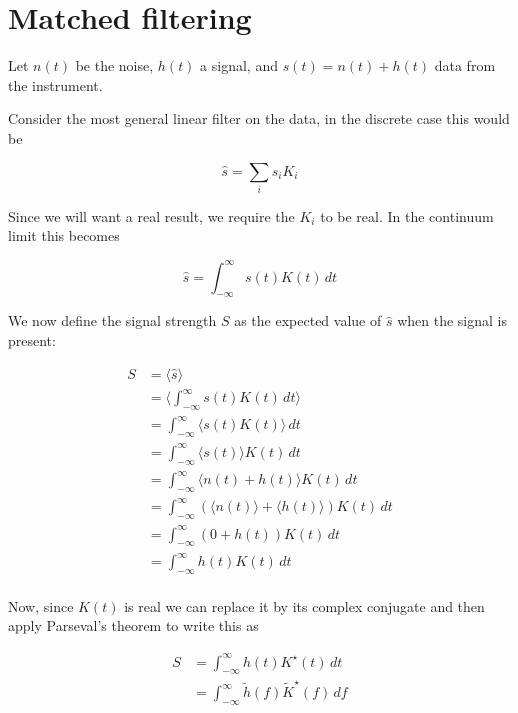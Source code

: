 
\section{Matched filtering}
\label{sec:ihope_match_filter}

Let $n(t)$ be the noise, $h(t)$ a signal, and $s(t)=n(t)+h(t)$ data
from the instrument.

Consider the most general linear filter on the data, in the discrete
case this would be

\begin{equation}
\hat{s} = \sum_i s_i K_i
\end{equation}

Since we will want a real result, we require the $K_i$ to be real.  In
the continuum limit this becomes

\begin{equation}
\hat{s} = \int_{-\infty}^\infty s(t) K(t)\, dt
\end{equation}

We now define the signal strength $S$ as the expected value of
$\hat{s}$ when the signal is present:

\begin{align}
S &= \langle \hat{s} \rangle \\
&= \langle  \int_{-\infty}^\infty s(t) K(t)\, dt \rangle \\
&= \int_{-\infty}^\infty \langle s(t) K(t)\rangle \, dt \\
&= \int_{-\infty}^\infty \langle s(t) \rangle K(t) \, dt \\
&= \int_{-\infty}^\infty \langle n(t) + h(t) \rangle K(t) \, dt \\
&= \int_{-\infty}^\infty \left( \langle n(t) \rangle + \langle h(t)
\rangle \right)  K(t) \, dt \\
&= \int_{-\infty}^\infty \left( 0 + h(t) \right)  K(t) \, dt \\
&= \int_{-\infty}^\infty h(t) K(t) \, dt \\
\end{align}

Now, since $K(t)$ is real we can replace it by its complex conjugate
and then apply Parseval's theorem to write this as

\begin{align}
S &= \int_{-\infty}^\infty h(t) K^\star(t) \, dt \\
&= \int_{-\infty}^\infty \tilde{h}(f) \tilde{K}^\star(f) \, df \\
\end{align}

